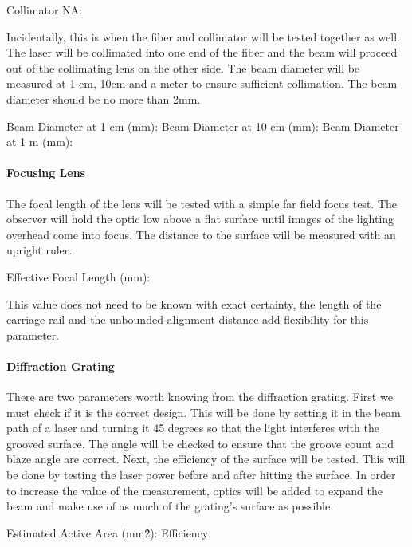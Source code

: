 Collimator NA:
\bigskip

Incidentally, this is when the fiber and collimator will be tested together as well. The laser will be collimated into one end of the fiber and the beam will proceed out of the collimating lens on the other side. The beam diameter will be measured at 1 cm, 10cm and a meter to ensure sufficient collimation. The beam diameter should be no more than 2mm.
\bigskip

Beam Diameter at 1 cm (mm):	
Beam Diameter at 10 cm (mm):	
Beam Diameter at 1 m (mm):	

\paragraph{Focusing Lens} The focal length of the lens will be tested with a simple far field focus test. The observer will hold the optic low above a flat surface until images of the lighting overhead come into focus. The distance to the surface will be measured with an upright ruler.
\bigskip

Effective Focal Length (mm):
\bigskip

This value does not need to be known with exact certainty, the length of the carriage rail and the unbounded alignment distance add flexibility for this parameter.

\paragraph{Diffraction Grating} There are two parameters worth knowing from the diffraction grating. First we must check if it is the correct design. This will be done by setting it in the beam path of a laser and turning it 45 degrees so that the light interferes with the grooved surface. The angle will be checked to ensure that the groove count and blaze angle are correct. Next, the efficiency of the surface will be tested. This will be done by testing the laser power before and after hitting the surface. In order to increase the value of the measurement, optics will be added to expand the beam and make use of as much of the grating’s surface as possible.
\bigskip

Estimated Active Area (mm\^2):
Efficiency:

